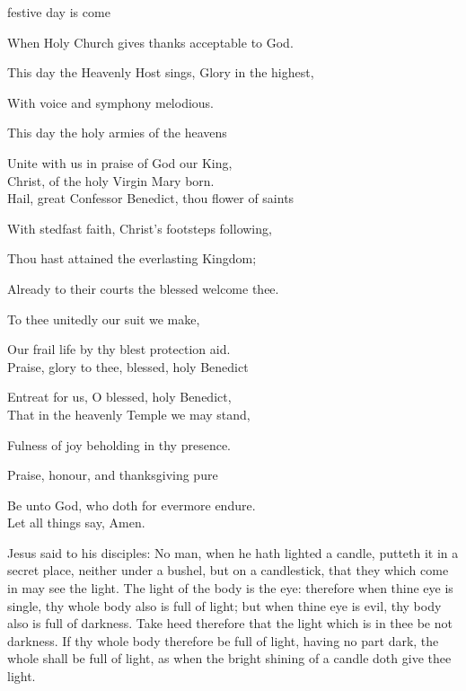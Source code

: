 \begin{multicols}{2}
 festive day is come\par
{}

When Holy Church gives thanks acceptable to God.

This day the Heavenly Host sings, Glory in the highest,

With voice and symphony melodious.

This day the holy armies of the heavens

Unite with us in praise of God our King,\\

Christ, of the holy Virgin Mary born.\\

Hail, great Confessor Benedict, thou flower of saints

With stedfast faith, Christ's footsteps following,

Thou hast attained the everlasting Kingdom;

Already to their courts the blessed welcome thee.

To thee unitedly our suit we make,

Our frail life by thy blest protection aid.\\

Praise, glory to thee, blessed, holy Benedict

Entreat for us, O blessed, holy Benedict,\\

That in the heavenly Temple we may stand,

Fulness of joy beholding in thy presence.

Praise, honour, and thanksgiving pure

Be unto God, who doth for evermore endure.\\

Let all things say, Amen.
\end{multicols}
 Jesus said to his disciples: No man, when he hath lighted a candle, putteth it in a secret place, neither under a bushel, but on a candlestick, that they which come in may see the light. The light of the body is the eye: therefore when thine eye is single, thy whole body also is full of light; but when thine eye is evil, thy body also is full of darkness. Take heed therefore that the light which is in thee be not darkness. If thy whole body therefore be full of light, having no part dark, the whole shall be full of light, as when the bright shining of a candle doth give thee light.

